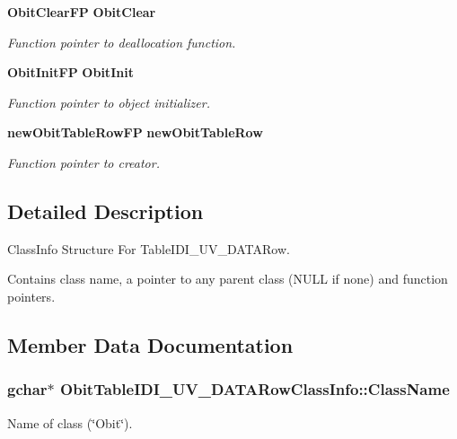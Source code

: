 \begin{CompactItemize}
{\bf Obit\-Clear\-FP} {\bf Obit\-Clear}
\begin{CompactList}\small\item\em Function pointer to deallocation function. \item\end{CompactList}\item 
{\bf Obit\-Init\-FP} {\bf Obit\-Init}
\begin{CompactList}\small\item\em Function pointer to object initializer. \item\end{CompactList}\item 
{\bf new\-Obit\-Table\-Row\-FP} {\bf new\-Obit\-Table\-Row}
\begin{CompactList}\small\item\em Function pointer to creator. \item\end{CompactList}\end{CompactItemize}


\subsection{Detailed Description}
Class\-Info Structure For Table\-IDI\_\-UV\_\-DATARow. 

Contains class name, a pointer to any parent class (NULL if none) and function pointers. 



\subsection{Member Data Documentation}
\subsubsection{\setlength{\rightskip}{0pt plus 5cm}gchar$\ast$ {\bf Obit\-Table\-IDI\_\-UV\_\-DATARow\-Class\-Info::Class\-Name}}\label{structObitTableIDI__UV__DATARowClassInfo_o2}


Name of class (\char`\"{}Obit\char`\"{}). 

